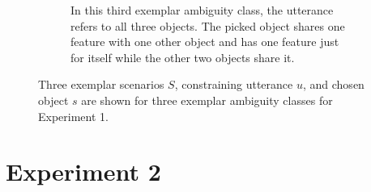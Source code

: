 \documentclass[10pt,a4paper]{article}
\begin{document}
\begin{figure}[htb]
\begin{subfigure}{\linewidth}
\begin{subfigure}[b]{0.3\linewidth}
\end{subfigure}
\hspace*{0.3cm}
\begin{subfigure}[b]{0.3\linewidth}
\end{subfigure}
\caption{In this third exemplar ambiguity class, the utterance refers to all three objects. The picked object shares one feature with one other object and has one feature just for itself while the other two objects share it.}
\end{subfigure}
\caption{Three exemplar scenarios $S$, constraining utterance $u$, and chosen object $s$ are shown for three exemplar ambiguity classes for Experiment 1.}
\label{fig:ambiguity-classes-exp1}
\end{figure}

\section*{Experiment 2}
\end{document}
